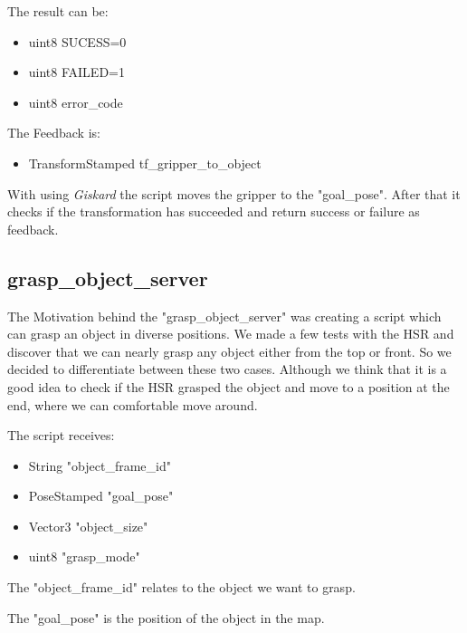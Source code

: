 \documentclass[main.tex]{subfiles}
\begin{document}
     	 \vspace{0,75 cm}
     	 The result can be:
     	\begin{itemize}
     		\item uint8 SUCESS=0
     		\item uint8 FAILED=1
     		\item uint8 error\_code
     	\end{itemize}
     	
     	\vspace{0,75 cm}
     	The Feedback is:
     	\begin{itemize}
     		\item TransformStamped tf\_gripper\_to\_object
     	\end{itemize}
	
		  \vspace{0,75 cm}
		With using \textit{Giskard} the script moves the gripper to the "goal\_pose". After that it checks if the transformation has succeeded and return success or failure as feedback.
		
		\newpage
		\subsection{grasp\_object\_server} 
		
			The Motivation behind the "grasp\_object\_server" was creating a script which can grasp an object in diverse positions. We made a few tests with the HSR and discover that we can nearly grasp any object either from the top or front. So we decided to differentiate between these two cases. Although we think that it is a good idea to check if the HSR grasped the object and move to a position at the end, where we can comfortable move around.
			
			The script receives: 
			\begin{itemize}
				\item String "object\_frame\_id"
				\item PoseStamped "goal\_pose"
				\item Vector3 "object\_size"
				\item uint8 "grasp\_mode"
			\end{itemize}
			
			\vspace{0,25 cm}
			The "object\_frame\_id" relates to the object we want to grasp.
		
			\vspace{0,25 cm}
			The "goal\_pose" is the position of the object in the map.
\end{document}

